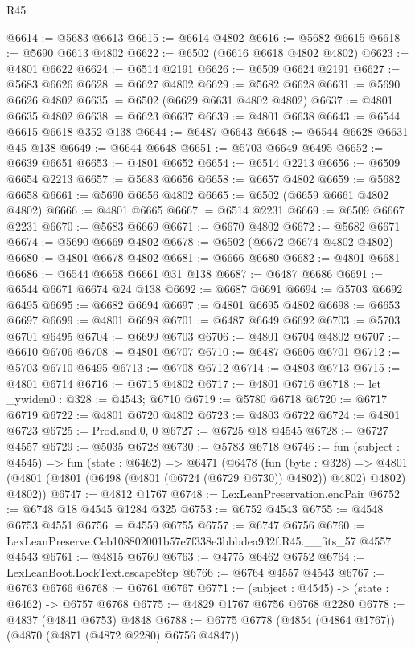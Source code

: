 \begin{lexlean}{R45}
\begin{coremodule}
@6614 := @5683 @6613
@6615 := @6614 @4802
@6616 := @5682 @6615
@6618 := @5690 @6613 @4802
@6622 := @6502 (@6616 @6618 @4802 @4802)
@6623 := @4801 @6622
@6624 := @6514 @2191
@6626 := @6509 @6624 @2191
@6627 := @5683 @6626
@6628 := @6627 @4802
@6629 := @5682 @6628
@6631 := @5690 @6626 @4802
@6635 := @6502 (@6629 @6631 @4802 @4802)
@6637 := @4801 @6635 @4802
@6638 := @6623 @6637
@6639 := @4801 @6638
@6643 := @6544 @6615 @6618 @352 @138
@6644 := @6487 @6643
@6648 := @6544 @6628 @6631 @45 @138
@6649 := @6644 @6648
@6651 := @5703 @6649 @6495
@6652 := @6639 @6651
@6653 := @4801 @6652
@6654 := @6514 @2213
@6656 := @6509 @6654 @2213
@6657 := @5683 @6656
@6658 := @6657 @4802
@6659 := @5682 @6658
@6661 := @5690 @6656 @4802
@6665 := @6502 (@6659 @6661 @4802 @4802)
@6666 := @4801 @6665
@6667 := @6514 @2231
@6669 := @6509 @6667 @2231
@6670 := @5683 @6669
@6671 := @6670 @4802
@6672 := @5682 @6671
@6674 := @5690 @6669 @4802
@6678 := @6502 (@6672 @6674 @4802 @4802)
@6680 := @4801 @6678 @4802
@6681 := @6666 @6680
@6682 := @4801 @6681
@6686 := @6544 @6658 @6661 @31 @138
@6687 := @6487 @6686
@6691 := @6544 @6671 @6674 @24 @138
@6692 := @6687 @6691
@6694 := @5703 @6692 @6495
@6695 := @6682 @6694
@6697 := @4801 @6695 @4802
@6698 := @6653 @6697
@6699 := @4801 @6698
@6701 := @6487 @6649 @6692
@6703 := @5703 @6701 @6495
@6704 := @6699 @6703
@6706 := @4801 @6704 @4802
@6707 := @6610 @6706
@6708 := @4801 @6707
@6710 := @6487 @6606 @6701
@6712 := @5703 @6710 @6495
@6713 := @6708 @6712
@6714 := @4803 @6713
@6715 := @4801 @6714
@6716 := @6715 @4802
@6717 := @4801 @6716
@6718 := let _ywiden0 : @328 := @4543; @6710
@6719 := @5780 @6718
@6720 := @6717 @6719
@6722 := @4801 @6720 @4802
@6723 := @4803 @6722
@6724 := @4801 @6723
@6725 := Prod.snd.{0, 0}
@6727 := @6725 @18 @4545
@6728 := @6727 @4557
@6729 := @5035 @6728
@6730 := @5783 @6718
@6746 := fun (subject : @4545) =>
  fun (state : @6462) =>
  @6471
    (@6478
      (fun (byte : @328) =>
      @4801 (@4801 (@4801 (@6498 (@4801 (@6724 (@6729 @6730)) @4802)) @4802) @4802) @4802))
@6747 := @4812 @1767
@6748 := LexLeanPreservation.encPair
@6752 := @6748 @18 @4545 @1284 @325
@6753 := @6752 @4543
@6755 := @4548 @6753 @4551
@6756 := @4559 @6755
@6757 := @6747 @6756
@6760 := LexLeanPreserve.Ceb108802001b57e7f338e3bbbdea932f.R45.__fits_57 @4557 @4543
@6761 := @4815 @6760
@6763 := @4775 @6462 @6752
@6764 := LexLeanBoot.LockText.escapeStep
@6766 := @6764 @4557 @4543
@6767 := @6763 @6766
@6768 := @6761 @6767
@6771 := (subject : @4545) -> (state : @6462) -> @6757 @6768
@6775 := @4829 @1767 @6756 @6768 @2280
@6778 := @4837 (@4841 @6753) @4848
@6788 := @6775 @6778 (@4854 (@4864 @1767)) (@4870 (@4871 (@4872 @2280) @6756 @4847))

\end{coremodule}
\end{lexlean}
